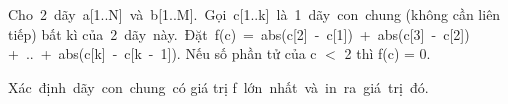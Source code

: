 Cho 2 dãy a[1..N] và b[1..M]. Gọi c[1..k] là 1 dãy con chung (không cần liên tiếp) bất kì của 2 dãy này. Đặt f(c) = abs(c[2] - c[1]) + abs(c[3] - c[2]) + .. + abs(c[k] - c[k - 1]). Nếu số phần tử của c $<$ 2 thì f(c) = 0.

Xác định dãy con chung có giá trị f lớn nhất và in ra giá trị đó.